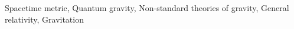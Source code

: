 \documentclass[twocolumn]{aastex631}
\begin{document}
Spacetime metric, Quantum gravity, Non-standard theories of gravity, General relativity, Gravitation
\end{document}
